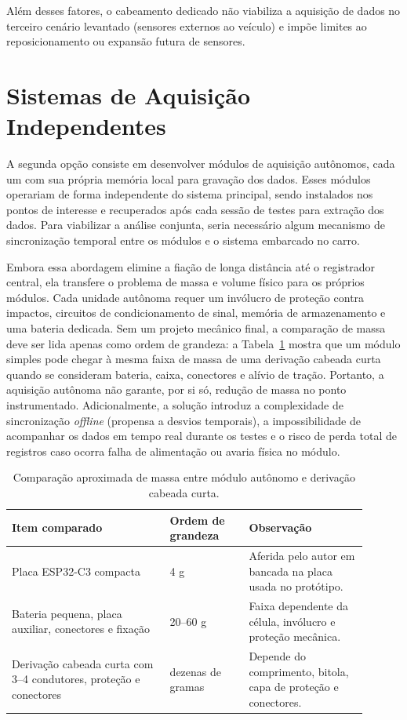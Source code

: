 Além desses fatores, o cabeamento dedicado não viabiliza a aquisição de dados no terceiro cenário levantado (sensores externos ao veículo) e impõe limites ao reposicionamento ou expansão futura de sensores.

\section{Sistemas de Aquisição Independentes}

A segunda opção consiste em desenvolver módulos de aquisição autônomos, cada um com sua própria memória local para gravação dos dados. Esses módulos operariam de forma independente do sistema principal, sendo instalados nos pontos de interesse e recuperados após cada sessão de testes para extração dos dados. Para viabilizar a análise conjunta, seria necessário algum mecanismo de sincronização temporal entre os módulos e o sistema embarcado no carro.

Embora essa abordagem elimine a fiação de longa distância até o registrador central, ela transfere o problema de massa e volume físico para os próprios módulos. Cada unidade autônoma requer um invólucro de proteção contra impactos, circuitos de condicionamento de sinal, memória de armazenamento e uma bateria dedicada. Sem um projeto mecânico final, a comparação de massa deve ser lida apenas como ordem de grandeza: a Tabela~\ref{tab:massa-modulo-autonomo} mostra que um módulo simples pode chegar à mesma faixa de massa de uma derivação cabeada curta quando se consideram bateria, caixa, conectores e alívio de tração. Portanto, a aquisição autônoma não garante, por si só, redução de massa no ponto instrumentado. Adicionalmente, a solução introduz a complexidade de sincronização \emph{offline} (propensa a desvios temporais), a impossibilidade de acompanhar os dados em tempo real durante os testes e o risco de perda total de registros caso ocorra falha de alimentação ou avaria física no módulo.

\begin{table}[htbp]
\centering
\small
\setlength{\tabcolsep}{5pt}
\renewcommand{\arraystretch}{1.12}
\begin{tabular}{p{0.40\linewidth}|p{0.20\linewidth}|p{0.30\linewidth}}
\hline
Item comparado & Ordem de grandeza & Observação \\
\hline
Placa ESP32-C3 compacta & 4 g & Aferida pelo autor em bancada na placa usada no protótipo. \\
\hline
Bateria pequena, placa auxiliar, conectores e fixação & 20--60 g & Faixa dependente da célula, invólucro e proteção mecânica. \\
\hline
Derivação cabeada curta com 3--4 condutores, proteção e conectores & dezenas de gramas & Depende do comprimento, bitola, capa de proteção e conectores. \\
\hline
\end{tabular}
\caption{Comparação aproximada de massa entre módulo autônomo e derivação cabeada curta.}
\label{tab:massa-modulo-autonomo}
\end{table}

